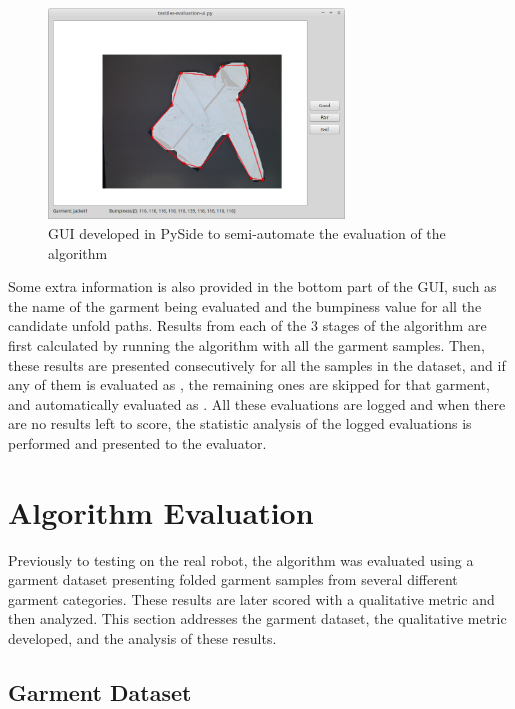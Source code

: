 \begin{figure}[thpb]
    \centering
    \includegraphics[width=0.7\textwidth]
    {figures/evaluation-gui.png}
    \caption[GUI developed in PySide to semi-automate the evaluation of the algorithm]
    {GUI developed in PySide to semi-automate the evaluation of the algorithm}
    \label{fig:gui}
\end{figure}


Some extra information is also provided in the bottom part of the GUI, such as the name of the garment being evaluated and the bumpiness value for all the candidate unfold paths. Results from each of the 3 stages of the algorithm are first calculated by running the algorithm with all the garment samples. Then, these results are presented consecutively for all the samples in the dataset, and if any of them is evaluated as \fail{}, the remaining ones are skipped for that garment, and automatically evaluated as \discarded{}. All these evaluations are logged and when there are no results left to score, the statistic analysis of the logged evaluations is performed and presented to the evaluator. 

\section{Algorithm Evaluation}
\label{experiments:evaluation}

Previously to testing on the real robot, the algorithm was evaluated using a garment dataset presenting folded garment samples from several different garment categories. These results are later scored with a qualitative metric and then analyzed. This section addresses the garment dataset, the qualitative metric developed, and the analysis of these results.

\subsection{Garment Dataset}
\label{experiments:dataset}


